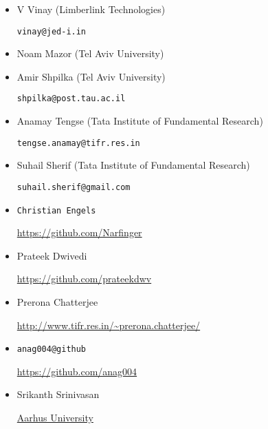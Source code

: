 \begin{itemize}
\item V Vinay (Limberlink Technologies)

\texttt{vinay@jed-i.in}

\item Noam Mazor (Tel Aviv University)

\item Amir Shpilka (Tel Aviv University)

\texttt{shpilka@post.tau.ac.il}

\item Anamay Tengse (Tata Institute of Fundamental Research)

\texttt{tengse.anamay@tifr.res.in}

\item Suhail Sherif (Tata Institute of Fundamental Research)

\texttt{suhail.sherif@gmail.com}

\item \texttt{Christian Engels}

  \url{https://github.com/Narfinger}

\item Prateek Dwivedi

  \url{https://github.com/prateekdwv}

\item Prerona Chatterjee

  \url{http://www.tifr.res.in/~prerona.chatterjee/}

\item \texttt{anag004@github}

  \url{https://github.com/anag004}

\item Srikanth Srinivasan

  \url{Aarhus University}

\end{itemize}


